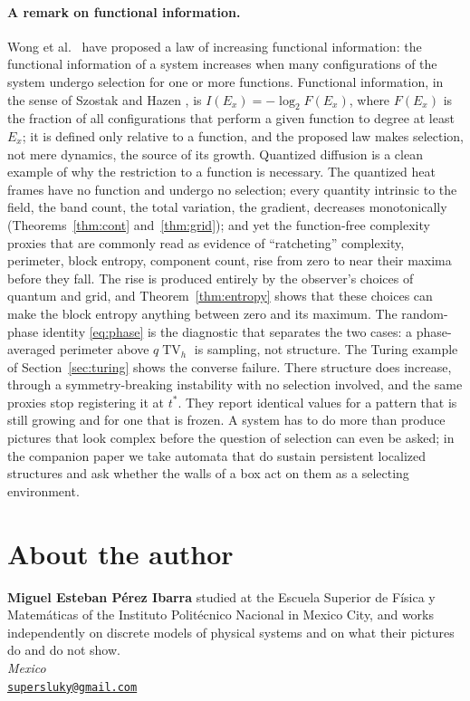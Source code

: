 \documentclass[11pt,a4paper]{article}
\theoremstyle{definition}
\theoremstyle{remark}
\newcommand{\TV}{\operatorname{TV}}
\begin{document}
\paragraph{A remark on functional information.} Wong et al.\
\cite{Wong2023} have proposed a law of increasing functional information:
the functional information of a system increases when many
configurations of the system undergo selection for one or more
functions. Functional information, in the sense of Szostak and Hazen
\cite{Szostak2003,Hazen2007}, is $I(E_x)=-\log_2F(E_x)$, where $F(E_x)$ is
the fraction of all configurations that perform a given function to
degree at least $E_x$; it is defined only relative to a function, and
the proposed law makes selection, not mere dynamics, the source of its
growth. Quantized diffusion is a clean example of why the restriction to a function
is necessary. The quantized heat frames have no function and undergo no
selection; every quantity intrinsic to the field, the band count, the
total variation, the gradient, decreases monotonically
(Theorems~\ref{thm:cont} and~\ref{thm:grid}); and yet the
function-free complexity proxies that are commonly read as evidence of
``ratcheting'' complexity, perimeter, block entropy, component count,
rise from zero to near their maxima before they fall. The rise is
produced entirely by the observer's choices of quantum and grid, and
Theorem~\ref{thm:entropy} shows that these choices can make the block
entropy anything between zero and its maximum. The random-phase
identity \eqref{eq:phase} is the diagnostic that separates the two
cases: a phase-averaged perimeter above $q\TV_h$ is sampling, not
structure. The Turing example of Section~\ref{sec:turing} shows the
converse failure. There structure does increase, through a symmetry-breaking
instability with no selection involved, and the same proxies stop
registering it at $t^\ast$. They report identical values for a pattern
that is still growing and for one that is frozen. A system has to do more than produce pictures that look
complex before the question of selection can even be asked; in the
companion paper \cite{MirrorWalls} we take automata that do sustain
persistent localized structures and ask whether the walls of a box act
on them as a selecting environment.

\section*{About the author}

\noindent\textbf{Miguel Esteban P\'erez Ibarra} studied at the Escuela
Superior de F\'isica y Matem\'aticas of the Instituto Polit\'ecnico
Nacional in Mexico City, and works independently on discrete models of
physical systems and on what their pictures do and do not show.\\[4pt]
\textit{Mexico}\\
\href{mailto:supersluky@gmail.com}{\texttt{supersluky@gmail.com}}
\end{document}
